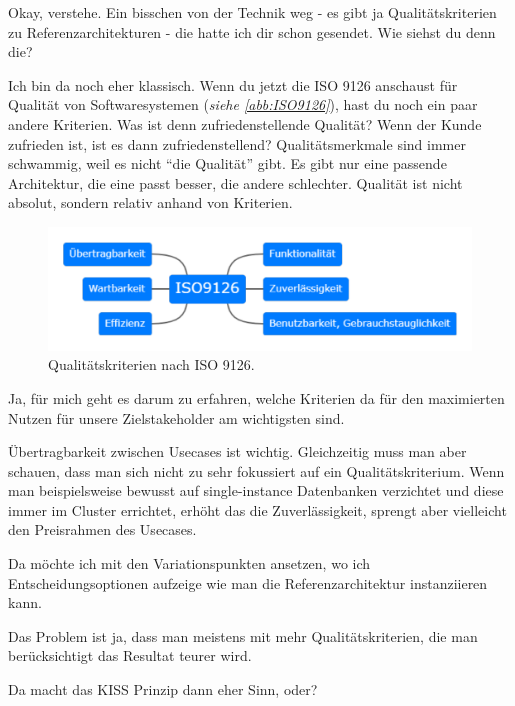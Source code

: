 \LF Okay, verstehe. Ein bisschen von der Technik weg - es gibt ja Qualitätskriterien zu Referenzarchitekturen - die hatte ich dir schon gesendet. Wie siehst du denn die?

\RB Ich bin da noch eher klassisch. Wenn du jetzt die ISO 9126 anschaust für Qualität von Softwaresystemen (\textit{siehe \autoref{abb:ISO9126}}), hast du noch ein paar andere Kriterien. Was ist denn zufriedenstellende Qualität? Wenn der Kunde zufrieden ist, ist es dann zufriedenstellend? Qualitätsmerkmale sind immer schwammig, weil es nicht \enquote{die Qualität} gibt. Es gibt nur eine passende Architektur, die eine passt besser, die andere schlechter. Qualität ist nicht absolut, sondern relativ anhand von Kriterien. 

\begin{figure}[H]
\centering
\includegraphics[width=\textwidth]{graphics/ISO-9126.pdf}
\caption[Qualitätskriterien nach ISO 9126]{Qualitätskriterien nach ISO 9126.\footnotemark}
\label{abb:ISO9126}
\end{figure}

\LF Ja, für mich geht es darum zu erfahren, welche Kriterien da für den maximierten Nutzen für unsere Zielstakeholder am wichtigsten sind.

\RB Übertragbarkeit zwischen Usecases ist wichtig. Gleichzeitig muss man aber schauen, dass man sich nicht zu sehr fokussiert auf ein Qualitätskriterium. Wenn man beispielsweise bewusst auf single-instance Datenbanken verzichtet und diese immer im Cluster errichtet, erhöht das die Zuverlässigkeit, sprengt aber vielleicht den Preisrahmen des Usecases. 

\LF Da möchte ich mit den Variationspunkten ansetzen, wo ich Entscheidungsoptionen aufzeige wie man die Referenzarchitektur instanziieren kann.

\RB Das Problem ist ja, dass man meistens mit mehr Qualitätskriterien, die man berücksichtigt das Resultat teurer wird.

\LF Da macht das KISS Prinzip dann eher Sinn, oder?


